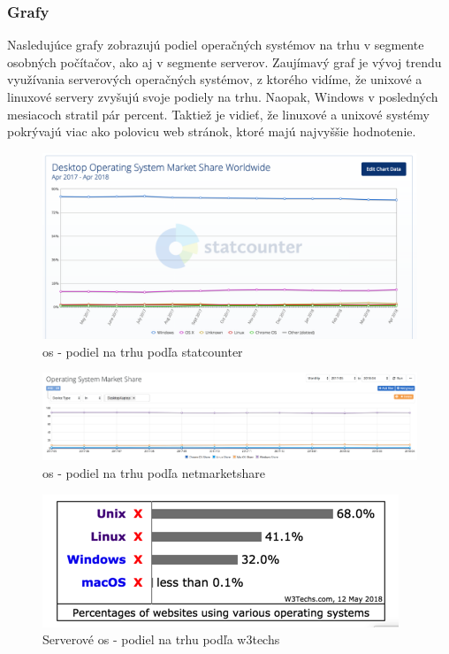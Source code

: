 \subsubsection{Grafy}
\indent Nasledujúce grafy zobrazujú podiel operačných systémov na trhu v segmente osobných počítačov, ako aj v segmente serverov. Zaujímavý graf je vývoj trendu využívania serverových operačných systémov, z ktorého vidíme, že unixové a linuxové servery zvyšujú svoje podiely na trhu. Naopak, Windows v posledných mesiacoch stratil pár percent. Taktiež je vidieť, že linuxové a unixové systémy pokrývajú viac ako polovicu web stránok, ktoré majú najvyššie hodnotenie.
\begin{figure}[!htbp]
	\centering
	\includegraphics[width=\linewidth]{img/statcounter.png}
	\caption{\gls{os} - podiel na trhu podľa statcounter\cite{statcounter}}
	\label{fig:test}
	
\end{figure}
\begin{figure}[!htbp]
	\centering
	\includegraphics[width=\linewidth]{img/netmarketshare.png}
	\caption{\gls{os} - podiel na trhu podľa netmarketshare\cite{netmarketshare}}
	\label{fig:test}
	
\end{figure}
\begin{figure}[!htbp]
	\centering
	\includegraphics[scale=0.4]{img/usg_server.png}
	\caption{Serverové \gls{os} - podiel na trhu podľa w3techs\cite{pop}}
	\label{fig:test}
	
\end{figure}
